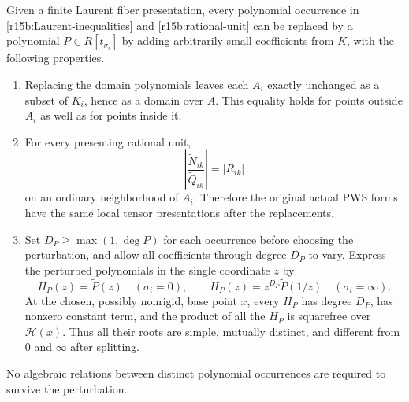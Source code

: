 \begin{proposition}
\label{r15b:separable-perturbation}
Given a finite Laurent fiber presentation, every polynomial
occurrence in \eqref{r15b:Laurent-inequalities} and
\eqref{r15b:rational-unit} can be replaced by a polynomial
$\widetilde P\in R[t_{\sigma_i}]$ by adding arbitrarily small
coefficients from $K$, with the following properties.
\begin{enumerate}
\item Replacing the domain polynomials leaves each $A_i$
exactly unchanged as a subset of $K_i$, hence as a domain over
$A$. This equality holds for points outside $A_i$ as well as
for points inside it.
\item For every presenting rational unit,
\[
       \left|\frac{\widetilde N_{ik}}{\widetilde Q_{ik}}\right|
                   =|R_{ik}|
\]
on an ordinary neighborhood of $A_i$. Therefore the original
actual PWS forms have the same local tensor presentations after
the replacements.
\item Set $D_P\geq\max(1,\deg P)$ for each occurrence before
choosing the perturbation, and allow all coefficients through
degree $D_P$ to vary. Express the perturbed polynomials in the
single coordinate $z$ by
\[
 H_P(z)=\widetilde P(z)\quad(\sigma_i=0),\qquad
 H_P(z)=z^{D_P}\widetilde P(1/z)\quad(\sigma_i=\infty).
\tag{SP15.5}\label{r15b:single-coordinate-polynomial}
\]
At the chosen, possibly nonrigid, base point $x$, every $H_P$
has degree $D_P$, has nonzero constant term, and the product
of all the $H_P$ is squarefree over $\mathcal H(x)$.
Thus all their roots are simple, mutually distinct, and
different from $0$ and $\infty$ after splitting.
\end{enumerate}
No algebraic relations between distinct polynomial occurrences
are required to survive the perturbation.
\end{proposition}

